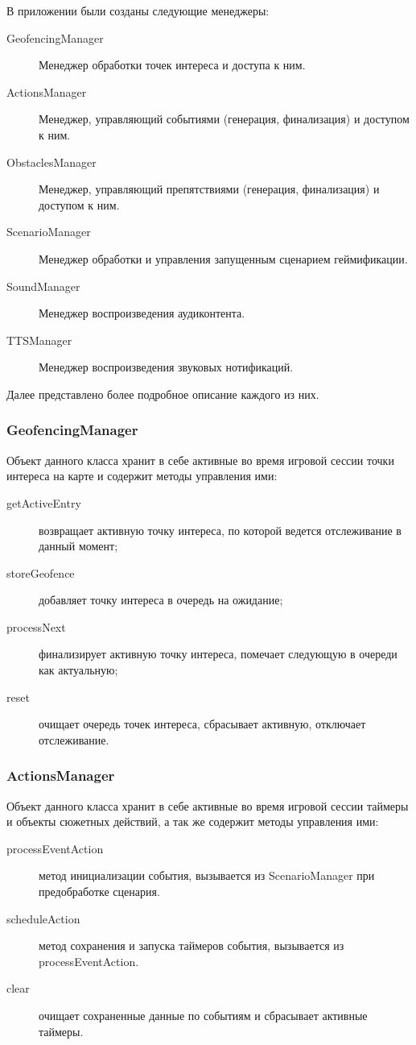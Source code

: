 В приложении были созданы следующие менеджеры:
\begin{description}
	\item[GeofencingManager] Менеджер обработки точек интереса и доступа к ним.
	\item[ActionsManager] Менеджер, управляющий событиями (генерация, финализация) и доступом к ним.
	\item[ObstaclesManager] Менеджер, управляющий препятствиями (генерация, финализация) и доступом к ним.
	\item[ScenarioManager] Менеджер обработки и управления запущенным сценарием геймификации.
	\item[SoundManager] Менеджер воспроизведения аудиконтента.
	\item[TTSManager] Менеджер воспроизведения звуковых нотификаций.
\end{description}
\smallskip
Далее представлено более подробное описание каждого из них.

\subsubsection*{GeofencingManager}
Объект данного класса хранит в себе активные во время игровой сессии точки интереса на карте и содержит методы управления ими:
\begin{description}
	\item[getActiveEntry] возвращает активную точку интереса, по которой ведется отслеживание в данный момент;
	\item[storeGeofence] добавляет точку интереса в очередь на ожидание;
	\item[processNext] финализирует активную точку интереса, помечает следующую в очереди как актуальную;
	\item[reset] очищает очередь точек интереса, сбрасывает активную, отключает отслеживание.
\end{description}

\subsubsection*{ActionsManager}
Объект данного класса хранит в себе активные во время игровой сессии таймеры и объекты сюжетных действий, а так же содержит методы управления ими:
\begin{description}
	\item[processEventAction] метод инициализации события, вызывается из ScenarioManager при предобработке сценария. 
	\item[scheduleAction] метод сохранения и запуска таймеров события, вызывается из processEventAction.
	\item[clear] очищает сохраненные данные по событиям и сбрасывает активные таймеры.
\end{description}

